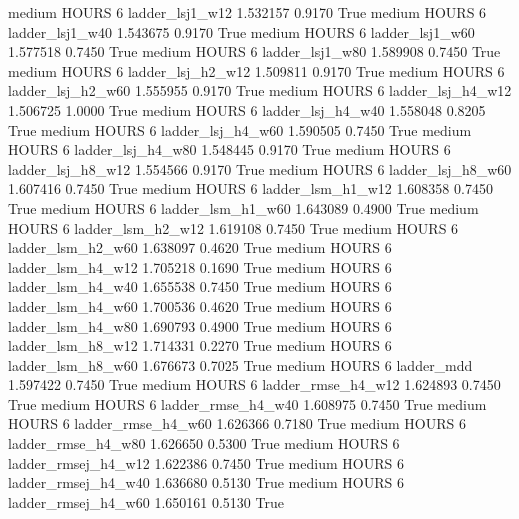     medium    HOURS                 6     ladder_lsj1_w12   1.532157      0.9170    True
    medium    HOURS                 6     ladder_lsj1_w40   1.543675      0.9170    True
    medium    HOURS                 6     ladder_lsj1_w60   1.577518      0.7450    True
    medium    HOURS                 6     ladder_lsj1_w80   1.589908      0.7450    True
    medium    HOURS                 6   ladder_lsj_h2_w12   1.509811      0.9170    True
    medium    HOURS                 6   ladder_lsj_h2_w60   1.555955      0.9170    True
    medium    HOURS                 6   ladder_lsj_h4_w12   1.506725      1.0000    True
    medium    HOURS                 6   ladder_lsj_h4_w40   1.558048      0.8205    True
    medium    HOURS                 6   ladder_lsj_h4_w60   1.590505      0.7450    True
    medium    HOURS                 6   ladder_lsj_h4_w80   1.548445      0.9170    True
    medium    HOURS                 6   ladder_lsj_h8_w12   1.554566      0.9170    True
    medium    HOURS                 6   ladder_lsj_h8_w60   1.607416      0.7450    True
    medium    HOURS                 6   ladder_lsm_h1_w12   1.608358      0.7450    True
    medium    HOURS                 6   ladder_lsm_h1_w60   1.643089      0.4900    True
    medium    HOURS                 6   ladder_lsm_h2_w12   1.619108      0.7450    True
    medium    HOURS                 6   ladder_lsm_h2_w60   1.638097      0.4620    True
    medium    HOURS                 6   ladder_lsm_h4_w12   1.705218      0.1690    True
    medium    HOURS                 6   ladder_lsm_h4_w40   1.655538      0.7450    True
    medium    HOURS                 6   ladder_lsm_h4_w60   1.700536      0.4620    True
    medium    HOURS                 6   ladder_lsm_h4_w80   1.690793      0.4900    True
    medium    HOURS                 6   ladder_lsm_h8_w12   1.714331      0.2270    True
    medium    HOURS                 6   ladder_lsm_h8_w60   1.676673      0.7025    True
    medium    HOURS                 6          ladder_mdd   1.597422      0.7450    True
    medium    HOURS                 6  ladder_rmse_h4_w12   1.624893      0.7450    True
    medium    HOURS                 6  ladder_rmse_h4_w40   1.608975      0.7450    True
    medium    HOURS                 6  ladder_rmse_h4_w60   1.626366      0.7180    True
    medium    HOURS                 6  ladder_rmse_h4_w80   1.626650      0.5300    True
    medium    HOURS                 6 ladder_rmsej_h4_w12   1.622386      0.7450    True
    medium    HOURS                 6 ladder_rmsej_h4_w40   1.636680      0.5130    True
    medium    HOURS                 6 ladder_rmsej_h4_w60   1.650161      0.5130    True
